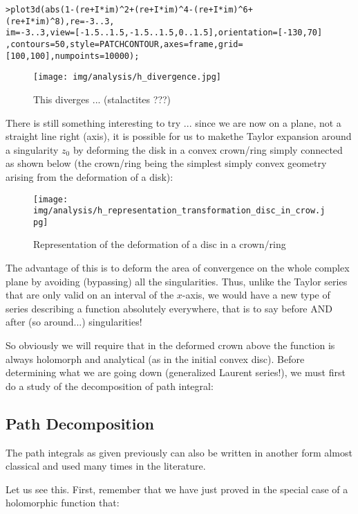	\texttt{>plot3d(abs(1-(re+I*im)\string^2+(re+I*im)\string^4-(re+I*im)\string^6+(re+I*im)\string^8),re=-3..3,\\
im=-3..3,view=[-1.5..1.5,-1.5..1.5,0..1.5],orientation=[-130,70]\\
	,contours=50,style=PATCHCONTOUR,axes=frame,grid=[100,100],numpoints=10000);}
	
	\begin{figure}[H]
		\begin{center}
			\texttt{[image: img/analysis/h\_divergence.jpg]}
		\end{center}	
		\caption[]{This diverges ... (stalactites ???)}
	\end{figure}
	There is still something interesting to try ... since we are now on a plane, not a straight line right (axis), it is possible for us to makethe Taylor expansion around a singularity $z_0$ by deforming the disk in a convex crown/ring simply connected as shown below (the crown/ring being the simplest simply convex geometry arising from the deformation of a disk):
	\begin{figure}[H]
		\begin{center}
			\texttt{[image: img/analysis/h\_representation\_transformation\_disc\_in\_crow.jpg]}
		\end{center}	
		\caption{Representation of the deformation of a disc in a crown/ring}
	\end{figure}
	The advantage of this is to deform the area of convergence on the whole complex plane by avoiding (bypassing) all the singularities. Thus, unlike the Taylor series that are only valid on an interval of the $x$-axis, we would have a new type of series describing a function absolutely everywhere, that is to say before AND after (so around...) singularities!
	
	So obviously we will require that in the deformed crown above the function is always holomorph and analytical (as in the initial convex disc). Before determining what we are going down (generalized Laurent series!), we must first do a study of the decomposition of path integral:
	
	\pagebreak
	\subsection{Path Decomposition}
	The path integrals as given previously can also be written in another form almost classical and used many times in the literature.
	
	Let us see this. First, remember that we have just proved in the special case of a holomorphic function that:
	
